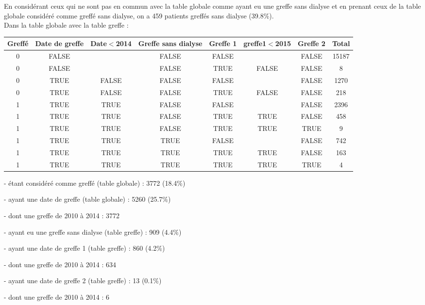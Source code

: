 \documentclass[11pt,a4paper]{article}\usepackage[]{graphicx}\usepackage[]{color}
\begin{document}
En considérant ceux qui ne sont pas en commun avec la table globale comme ayant eu une greffe sans dialyse et en prenant ceux de la table globale considéré comme greffé sans dialyse, on a 459 patients greffés sans dialyse (39.8\%).
~\\

Dans la table globale avec la table greffe :

\begin{table}[H]
\centering
\begin{tabular}{cccccccc}
  \hline
Greffé & Date de greffe & Date$<$2014 & Greffe sans dialyse & Greffe 1 & greffe1$<$2015 & Greffe 2 & Total \\ 
  \hline
0 & FALSE &  & FALSE & FALSE &  & FALSE & 15187 \\ 
  0 & FALSE &  & FALSE & TRUE & FALSE & FALSE & 8 \\ 
  0 & TRUE & FALSE & FALSE & FALSE &  & FALSE & 1270 \\ 
  0 & TRUE & FALSE & FALSE & TRUE & FALSE & FALSE & 218 \\ 
  1 & TRUE & TRUE & FALSE & FALSE &  & FALSE & 2396 \\ 
  1 & TRUE & TRUE & FALSE & TRUE & TRUE & FALSE & 458 \\ 
  1 & TRUE & TRUE & FALSE & TRUE & TRUE & TRUE & 9 \\ 
  1 & TRUE & TRUE & TRUE & FALSE &  & FALSE & 742 \\ 
  1 & TRUE & TRUE & TRUE & TRUE & TRUE & FALSE & 163 \\ 
  1 & TRUE & TRUE & TRUE & TRUE & TRUE & TRUE & 4 \\ 
   \hline
\end{tabular}
\end{table}


- étant considéré comme greffé (table globale) : 3772 (18.4\%)

- ayant une date de greffe (table globale) : 5260 (25.7\%)

\qquad - dont une greffe de 2010 à 2014 : 3772

- ayant eu une greffe sans dialyse (table greffe) : 909 (4.4\%)

- ayant une date de greffe 1 (table greffe) : 860 (4.2\%)

\qquad - dont une greffe de 2010 à 2014 : 634

- ayant une date de greffe 2 (table greffe) : 13 (0.1\%)

\qquad - dont une greffe de 2010 à 2014 : 6
\end{document}
